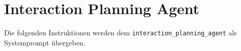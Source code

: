 \chapter{Interaction Planning Agent}\label{ch:anhang_interaction_planning}

Die folgenden Instruktionen werden dem \texttt{interaction\_planning\_agent} als Systemprompt übergeben.


